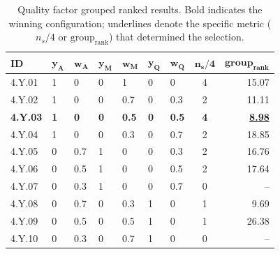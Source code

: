 \begin{table}[!t]
\centering
\footnotesize
\caption{Quality factor grouped ranked results. Bold indicates the winning configuration; underlines denote the specific metric ($n_s/4$ or $\text{group}_{\text{rank}}$) that determined the selection.}
\label{tab:quality_grouped_ranked}
\begin{tabular}{@{}lllllllcr@{}}
\hline
    \textbf{ID} & $\bm{y_{\text{A}}}$ & $\bm{w_{\text{A}}}$ & $\bm{y_{\text{M}}}$ & $\bm{w_{\text{M}}}$ & $\bm{y_{\text{Q}}}$ & $\bm{w_{\text{Q}}}$ & $\bm{n_s/4}$ & $\bm{\text{group}_{\text{rank}}}$ \\
\hline
    4.Y.01 & 1 & 0 & 0 & 1 & 0 & 0 & 4 & 15.07 \\
    4.Y.02 & 1 & 0 & 0 & 0.7 & 0 & 0.3 & 2 & 11.11 \\
    \textbf{4.Y.03} & \textbf{1} & \textbf{0} & \textbf{0} & \textbf{0.5} & \textbf{0} & \textbf{0.5} & \textbf{4} & \textbf{\underline{8.98}} \\
    4.Y.04 & 1 & 0 & 0 & 0.3 & 0 & 0.7 & 2 & 18.85 \\
    4.Y.05 & 0 & 0.7 & 1 & 0 & 0 & 0.3 & 2 & 16.76 \\
    4.Y.06 & 0 & 0.5 & 1 & 0 & 0 & 0.5 & 2 & 17.64 \\
    4.Y.07 & 0 & 0.3 & 1 & 0 & 0 & 0.7 & 0 & -- \\
    4.Y.08 & 0 & 0.7 & 0 & 0.3 & 1 & 0 & 1 & 9.69 \\
    4.Y.09 & 0 & 0.5 & 0 & 0.5 & 1 & 0 & 1 & 26.38 \\
    4.Y.10 & 0 & 0.3 & 0 & 0.7 & 1 & 0 & 0 & -- \\
\hline
\end{tabular}
\end{table}